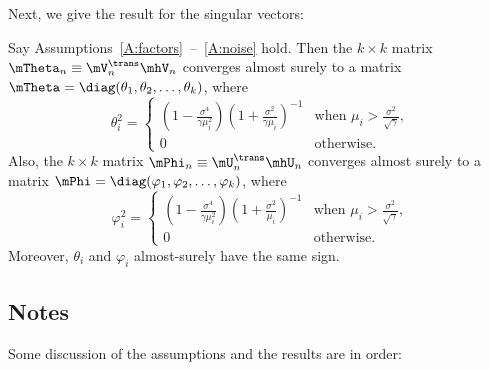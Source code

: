 Next, we give the result for the singular vectors:
\begin{theorem}\label{T:vectors}
    Say Assumptions~\ref{A:factors}~--~\ref{A:noise} hold.  Then the
    $k\times k$ matrix $\mTheta_n \equiv \mV_n^\trans \mhV_n$ converges almost 
    surely to a matrix 
    $\mTheta = \diag(\theta_1, \theta_2, \ldots, \theta_k)$, where
    \begin{equation}
        \theta_i^2
        =
        \begin{cases}
            \left( 1 - \frac{\sigma^4}{ \gamma \mu_i^2} \right)
            \left( 1 + \frac{\sigma^2}{ \gamma \mu_i  } \right)^{-1}
            &\text{when $\mu_i > \frac{\sigma^2}{\sqrt{\gamma}}$,} \\
            0
            &\text{otherwise.}
        \end{cases}
    \end{equation}
    Also, the $k\times k$ matrix $\mPhi_n \equiv \mU_n^\trans \mhU_n$
    converges almost surely to a matrix
    $\mPhi = \diag(\varphi_1, \varphi_2, \ldots, \varphi_k)$, where    
    \begin{equation}
        \varphi_i^2
        =
        \begin{cases}
            \left( 1 - \frac{\sigma^4}{ \gamma \mu_i^2} \right)
            \left( 1 + \frac{\sigma^2}{ \mu_i  } \right)^{-1}
            &\text{when $\mu_i > \frac{\sigma^2}{\sqrt{\gamma}}$,} \\
            0
            &\text{otherwise.}
        \end{cases}
    \end{equation}
    Moreover, $\theta_i$ and $\varphi_i$ almost-surely have the same
    sign.
\end{theorem}


\subsection{Notes}

Some discussion of the assumptions and the results are in order:

